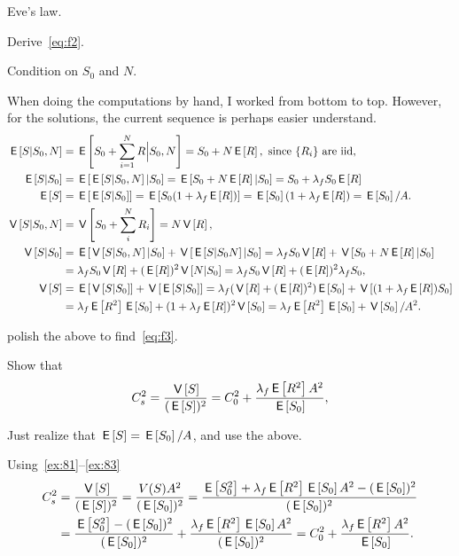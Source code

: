  Eve's law.

\begin{exercise}
Derive~\cref{eq:f2}.
\begin{hint}
Condition on $S_0$ and $N$.
\end{hint}
\begin{solution}
When doing the computations by hand, I worked from bottom to top. However, for the solutions, the current sequence is perhaps easier understand.
\begin{align*}
  \E{S|S_0, N} &=\E{S_0 + \sum_{i=1}^N R \Big|S_0, N} = S_0 + N \E R, \text{ since $\{R_i\}$ are iid},\\
  \E{S|S_0} &= \E{\E{S|S_{0}, N}|S_0} = \E{S_0 + N \E R |S_{0}} = S_0 + \lambda_f S_0 \E R\\
  \E{S} &= \E{\E{S|S_{0}}} = \E{S_0(1+\lambda_f  \E R)} = \E{S_0}(1 + \lambda_f \E R) = \E{S_0}/A.\\
  \V{S|S_0, N} &=  \V{S_0 + \sum_i^N R_i} = N \V R,\\
\V{S|S_0} &= \E{\V{S|S_0, N} |S_0} + \V{\E{S|S_{0}N}|S_{0}} = \lambda_f S_0 \V R + \V{S_{0} + N \E R|S_0}\\
  &= \lambda_f S_0\V R + (\E R)^{2} \V{N|S_0} = \lambda_f S_0\V R + (\E R)^{2} \lambda_{f} S_{0}, \\
  \V S &= \E{\V{S|S_0}} + \V{\E{S|S_0}} = \lambda_f (\V R + (\E R)^2) \E{S_0} + \V{(1+\lambda_f \E R)S_{0}} \\
  &= \lambda_f \E{R^2} \E{S_0} + (1+\lambda_f \E R)^2 \V{S_{0}} = \lambda_f \E{R^2} \E{S_0} + \V{S_{0}}/A^{2}.
\end{align*}

\end{solution}
\end{exercise}


 polish the above to find~\cref{eq:f3}.

\begin{exercise}\label{ex:l-160}
Show that
 \begin{equation*}
 C_s^2 = \frac{\V{S}}{(\E S)^2} = C_0^2 + \frac{\lambda_f \E{R^2} A^2}{\E{S_0}},
 \end{equation*}
\begin{hint} Just realize that $\E{S} = \E{S_0}/A$, and use the above.
\end{hint}
\begin{solution} Using~\cref{ex:81}--\cref{ex:83}
 \begin{align*}
C_s^2 &= \frac{\V{S}}{(\E S)^2} =\frac{V(S) A^2}{(\E{S_0})^2}
=\frac{\E{S_0^2} + \lambda_f \E{R^2} \E{S_0}A^2 -(\E{S_0})^2}{(\E{S_0})^2} \\
&=\frac{\E{S_0^2} -(\E{S_0})^2}{(\E{S_0})^2} + \frac{\lambda_f \E{R^2} \E{S_0}A^2}{(\E{S_0})^2}
=C_0^2 + \frac{\lambda_f \E{R^2}A^2}{\E{S_0}}.
 \end{align*}
\end{solution}
\end{exercise}


